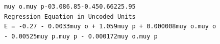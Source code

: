 \documentclass[12pt,a4paper]{article}
\newcommand{\code}[1]{\texttt{#1}}
\begin{document}
\code{muy o.muy p}\hspace*{0.8cm}\code{-03.08}\hspace*{1.7cm}\code{6.85}\hspace*{1.45cm}\code{-0.45}\hspace*{1.4cm}\code{0.662}\hspace*{0.5cm}\code{25.95}\\
\newline
\code{Regression Equation in Uncoded Units}\\
\newline
\code{E = -0.27 - 0.0033muy o + 1.059muy p + 0.000008muy o.muy o \\ \hspace*{4cm}- 0.00525muy p.muy p - 0.000172muy o.muy p}\\
%
%
\end{document}
